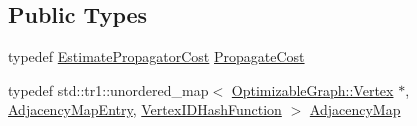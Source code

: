 \subsection*{Public Types}
\begin{DoxyCompactItemize}
\item 
typedef \hyperlink{classg2o_1_1EstimatePropagatorCost}{Estimate\+Propagator\+Cost} \hyperlink{classg2o_1_1EstimatePropagator_a67a42f9c6d5f92562ac4ea12f81c8d9c}{Propagate\+Cost}
\item 
typedef std\+::tr1\+::unordered\+\_\+map$<$ \hyperlink{classg2o_1_1OptimizableGraph_1_1Vertex}{Optimizable\+Graph\+::\+Vertex} $\ast$, \hyperlink{classg2o_1_1EstimatePropagator_1_1AdjacencyMapEntry}{Adjacency\+Map\+Entry}, \hyperlink{classg2o_1_1EstimatePropagator_1_1VertexIDHashFunction}{Vertex\+I\+D\+Hash\+Function} $>$ \hyperlink{classg2o_1_1EstimatePropagator_aa450038ec206c089ecf023cb88cb2847}{Adjacency\+Map}
\end{DoxyCompactItemize}
